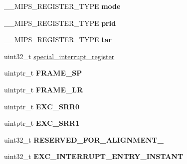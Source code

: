 \begin{DoxyCompactItemize}
\+\_\+\+\_\+\+M\+I\+P\+S\+\_\+\+R\+E\+G\+I\+S\+T\+E\+R\+\_\+\+T\+Y\+PE {\bfseries mode}
\item 
\mbox{\label{structCPU__Interrupt__frame_ab275194a28c34176bb51f4751c3db218}} 
\+\_\+\+\_\+\+M\+I\+P\+S\+\_\+\+R\+E\+G\+I\+S\+T\+E\+R\+\_\+\+T\+Y\+PE {\bfseries prid}
\item 
\mbox{\label{structCPU__Interrupt__frame_a618b00a01ad7cd030aa3d6a49d1c8340}} 
\+\_\+\+\_\+\+M\+I\+P\+S\+\_\+\+R\+E\+G\+I\+S\+T\+E\+R\+\_\+\+T\+Y\+PE {\bfseries tar}
\item 
uint32\+\_\+t \mbox{\hyperlink{structCPU__Interrupt__frame_aa7d40cbb21b6a03bc6b7b9018c64a566}{special\+\_\+interrupt\+\_\+register}}
\item 
\mbox{\label{structCPU__Interrupt__frame_a4b34b30a01b4bbb111137890d213a674}} 
uintptr\+\_\+t {\bfseries F\+R\+A\+M\+E\+\_\+\+SP}
\item 
\mbox{\label{structCPU__Interrupt__frame_a017845f8e190e7cc6f039f1a37ffbd0c}} 
uintptr\+\_\+t {\bfseries F\+R\+A\+M\+E\+\_\+\+LR}
\item 
\mbox{\label{structCPU__Interrupt__frame_af259e00e1f1108ebbc56077fb9fa5d22}} 
uintptr\+\_\+t {\bfseries E\+X\+C\+\_\+\+S\+R\+R0}
\item 
\mbox{\label{structCPU__Interrupt__frame_ae3d44c881f491cb122cf09034c8cb87e}} 
uintptr\+\_\+t {\bfseries E\+X\+C\+\_\+\+S\+R\+R1}
\item 
\mbox{\label{structCPU__Interrupt__frame_a538fb3ebf8b75174382048a72333c898}} 
uint32\+\_\+t {\bfseries R\+E\+S\+E\+R\+V\+E\+D\+\_\+\+F\+O\+R\+\_\+\+A\+L\+I\+G\+N\+M\+E\+N\+T\+\_}
\item 
\mbox{\label{structCPU__Interrupt__frame_a68d3a0b5bfb17eff27d5d3e5710468e4}} 
uint32\+\_\+t {\bfseries E\+X\+C\+\_\+\+I\+N\+T\+E\+R\+R\+U\+P\+T\+\_\+\+E\+N\+T\+R\+Y\+\_\+\+I\+N\+S\+T\+A\+NT}
\item 
\mbox{\label{structCPU__Interrupt__frame_a64c4be733037bdfa6ffbda624d2079f5}} 

\end{DoxyCompactItemize}
